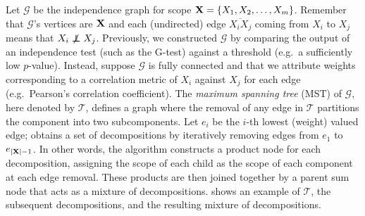 Let $\mathcal{G}$ be the independence graph for scope $\mathbf{X}=\{X_1,X_2,\ldots,X_m\}$. Remember that
$\mathcal{G}$'s vertices are $\mathbf{X}$ and each (undirected) edge $\overline{X_i X_j}$ coming from
$X_i$ to $X_j$ means that $X_i\notindep X_j$. Previously, we constructed $\mathcal{G}$ by comparing
the output of an independence test (such as the G-test) against a threshold (e.g.\ a sufficiently
low $p$-value). Instead, suppose $\mathcal{G}$ is fully connected and that we attribute weights
corresponding to a correlation metric of $X_i$ against $X_j$ for each edge (e.g.\ Pearson's
correlation coefficient). The \emph{maximum spanning tree} (MST) of $\mathcal{G}$, here denoted by
$\mathcal{T}$, defines a graph where the removal of any edge in $\mathcal{T}$ partitions the
component into two subcomponents. Let $e_i$ be the $i$-th lowest (weight) valued edge;
 obtains a set of decompositions by iteratively removing edges from $e_1$ to
$e_{|\mathbf{X}|-1}$. In other words, the algorithm constructs a product node for each decomposition,
assigning the scope of each child as the scope of each component at each edge removal. These
products are then joined together by a parent sum node that acts as a mixture of decompositions.
 shows an example of $\mathcal{T}$, the subsequent decompositions, and the
resulting mixture of decompositions.

